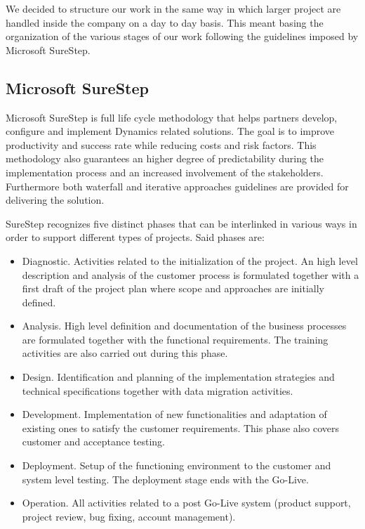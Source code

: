 We decided to structure our work in the same way in which larger project are handled inside the company on a day to day basis. This meant basing the organization of the various stages of our work following the guidelines imposed by Microsoft SureStep.

\subsection{Microsoft SureStep}

Microsoft SureStep \cite{SureStepBook} is full life cycle methodology that helps partners develop, configure and implement Dynamics related solutions. The goal is to improve productivity and success rate while reducing costs and risk factors. This methodology also guarantees an higher degree of predictability during the implementation process and an increased involvement of the stakeholders. Furthermore both waterfall and iterative approaches guidelines are provided for delivering the solution.

SureStep recognizes five distinct phases that can be interlinked in various ways in order to support different types of projects. Said phases are: 

\begin{itemize}
    \item Diagnostic. Activities related to the initialization of the project. An high level description and analysis of the customer process is formulated together with a first draft of the project plan where scope and approaches are initially defined. 
    \item Analysis. High level definition and documentation of the business processes are formulated together with the functional requirements. The training activities are also carried out during this phase.
    \item Design. Identification and planning of the implementation strategies and technical specifications together with data migration activities.
    \item Development. Implementation of new functionalities and adaptation of existing ones to satisfy the customer requirements. This phase also covers customer and acceptance testing. 
    \item Deployment. Setup of the functioning environment to the customer and system level testing. The deployment stage ends with the Go-Live.
    \item Operation. All activities related to a post Go-Live system (product support, project review, bug fixing, account management).
\end{itemize}

